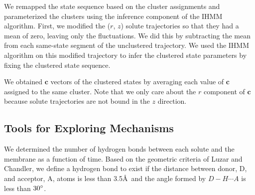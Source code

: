 \documentclass[journal=jpcbfk,manuscript=article]{achemso}
\begin{document}
  We remapped the state sequence based on the cluster assignments and parameterized
  the clusters using the inference component of the IHMM algorithm. 
  First, we modified the ($r$, $z$) solute trajectories so that they had a mean of zero,
  leaving only the fluctuations. We did this by subtracting the mean from each 
  same-state segment of the unclustered trajectory. We used the IHMM algorithm on this
  modified trajectory to infer the clustered state parameters by fixing the clustered 
  state sequence. 
  
  We obtained $\mathbf{c}$ vectors of the clustered states by averaging 
  each value of $\mathbf{c}$ assigned to the same cluster. Note that we only care
  about the $r$ component of $\mathbf{c}$ because solute trajectories are not 
  bound in the $z$ direction.
  
  
  \subsection{Tools for Exploring Mechanisms}\label{method:interactions}
  
  We determined the number of hydrogen bonds between each solute and the membrane
  as a function of time. Based on the geometric criteria of Luzar and Chandler, we 
  define a hydrogen bond to exist if the distance between donor, D, and acceptor, 
  A, atoms is less than 3.5\AA~and the angle formed by $D-H \cdots A$ is less than 
  $30\degree$.~\cite{luzar_effect_1996}
  
\end{document}
